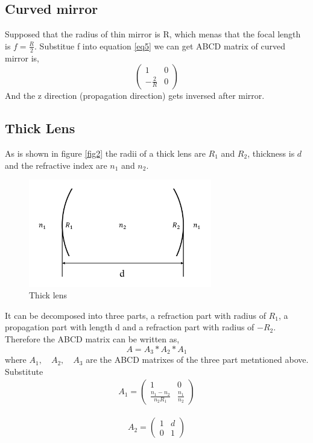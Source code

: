 \documentclass{article}
\begin{document}
\subsection{Curved mirror}
Supposed that the radius of thin mirror is R, which menas that the focal length is $f=\frac{R}{2}$. Substitue f into equation \ref{eq5} we can get ABCD matrix of curved mirror is,
\begin{equation}\label{eq6}
\left(
\begin{array}{cc}
1 & 0\\
-\frac{2}{R} & 0
\end{array}
\right)
\end{equation}
And the z direction (propagation direction) gets inversed after mirror.
\subsection{Thick Lens}
As is shown in figure \ref{fig2} the radii of a thick lens are $ R_1 $ and $ R_2 $, thickness is $ d $ and the refractive index are $ n_1 $ and $ n_2 $.
\begin{figure}[h]
	\centering
	\includegraphics[width=8cm]{thick_lens.png}
	\caption{Thick lens}
	\label{fig3}
\end{figure}
It can be decomposed into three parts, a refraction part with radius of $ R_1 $, a propagation part with length d and a refraction part with radius of $ -R_2 $. Therefore the ABCD matrix can be written as,
\begin{equation}\label{eq7}
A=A_3*A_2*A_1
\end{equation}
where $ A_1,\quad A_2,\quad A_3 $ are the ABCD matrixes of the three part metntioned above. Substitute
$$
\begin{array}{l}
A_1=
\left(
\begin{array}{cc}
1 & 0\\
\frac{n_1-n_2}{n_2R_1} & \frac{n_1}{n_2}
\end{array}
\right)
\end{array}
$$

$$
\begin{array}{l}
A_2=
\left(
\begin{array}{cc}
1 & d\\
0 & 1
\end{array}
\right)
\end{array}
$$
\end{document}
